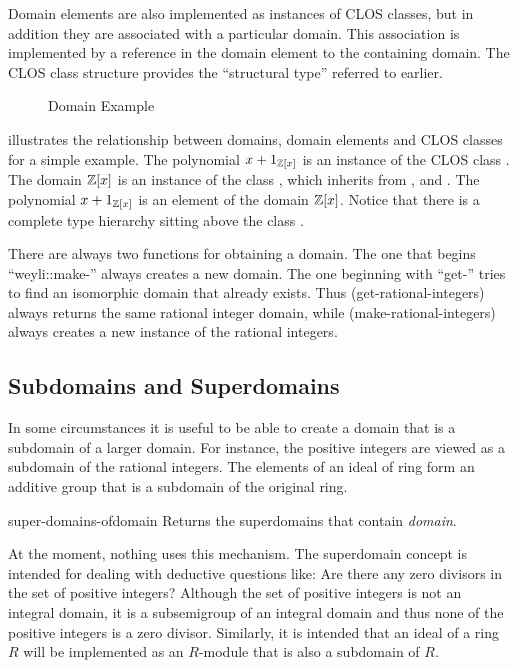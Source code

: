 Domain elements are also implemented as instances of CLOS classes, but
in addition they are associated with a particular domain.  This
association is implemented by a reference in the domain element to the
containing domain. The CLOS class structure provides the ``structural
type'' referred to earlier.

\begin{figure}
\begin{center}
\end{center}
\caption{Domain Example\label{Domain:Ex:Fig}}
\end{figure}

 illustrates the relationship between domains,
domain elements and CLOS classes for a simple example.  The polynomial
$x+1_{{\Bbb Z}[x]}$ is an instance of the CLOS class .  The
domain ${\Bbb Z}[x]$ is an instance of the class ,
which inherits from ,  and
.  The polynomial $x+1_{{\Bbb Z}[x]}$ is an element
of the domain ${\Bbb Z}[x]$.  Notice that there is a complete type hierarchy
sitting above the class .

There are always two functions for obtaining a domain.  The one
that begins ``{\sf weyli::make-}'' always creates a new domain.  The one
beginning with ``{\sf get-}'' tries to find an isomorphic domain that
already exists.  Thus {\sf (get-rational-integers)} always returns the
same rational integer domain, while {\sf (make-rational-integers)}
always creates a new instance of the rational integers.

\subsection{Subdomains and Superdomains}

In some circumstances it is useful to be able to create a domain that
is a subdomain of a larger domain.  For instance, the positive
integers are viewed as a subdomain of the rational integers. The elements
of an ideal of ring form an additive group that is a subdomain of the
original ring.

\begin{genericdef}{super-domains-of}{domain}
Returns the superdomains that contain {\em domain}.
\end{genericdef}

At the moment, nothing uses this mechanism. The superdomain concept
is intended for dealing with deductive questions like: Are there any
zero divisors in the set of positive integers? Although the set of
positive integers is not an integral domain, it is a subsemigroup of an
integral domain and thus none of the positive integers is a zero
divisor.  Similarly, it is intended that an ideal of a ring $R$ will be
implemented as an $R$-module that is also a subdomain of $R$.

